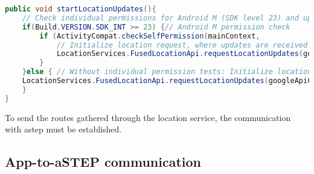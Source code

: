 \begin{lstlisting}[language=Java, label=startLocationUpdates, caption=Start location updates functions.]
public void startLocationUpdates(){
	// Check individual permissions for Android M (SDK level 23) and up.
	if(Build.VERSION.SDK_INT >= 23) {// Android M permission check
		if (ActivityCompat.checkSelfPermission(mainContext, 			Manifest.permission.ACCESS_FINE_LOCATION) == PackageManager.PERMISSION_GRANTED){
			// Initialize location request, where updates are received by onLocationChanged()
			LocationServices.FusedLocationApi.requestLocationUpdates(googleApiClient, locationRequest, this);
		}
	}else { // Without individual permission tests: Initialize location request, where updates are received by onLocationChanged()
	LocationServices.FusedLocationApi.requestLocationUpdates(googleApiClient, locationRequest, this);
	}
}
\end{lstlisting}

To send the routes gathered through the location service, the communication with \gls{astep} must be established.

\subsection{App-to-aSTEP communication}
